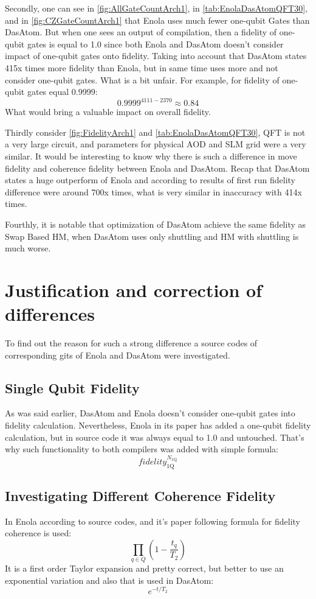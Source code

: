 Secondly, one can see in \ref{fig:AllGateCountArch1}, in \ref{tab:EnolaDasAtomQFT30}, 
and in \ref{fig:CZGateCountArch1} that Enola uses much fewer one-qubit Gates than DasAtom. 
But when one sees an output of compilation, 
then a fidelity of one-qubit gates is equal to 1.0 
since both Enola and DasAtom doesn't consider impact of one-qubit gates onto fidelity.
Taking into account that DasAtom states 415x times more fidelity than Enola, 
but in same time uses more and not consider one-qubit gates. What is a bit unfair.
For example, for fidelity of one-qubit gates equal 0.9999: \[0.9999^{4111 - 2370} \approx 0.84\]
What would bring a valuable impact on overall fidelity.

Thirdly consider \ref{fig:FidelityArch1} and \ref{tab:EnolaDasAtomQFT30}, \ac{QFT} is not a very large circuit, and parameters for physical \ac{AOD} and \ac{SLM} grid were a very similar.
It would be interesting to know why there is such a difference in move fidelity and coherence fidelity between Enola and DasAtom.
Recap that DasAtom states a huge outperform of Enola and according to results of first run fidelity difference were around 700x times, what is very similar in inaccuracy with 414x times.

Fourthly, it is notable that optimization of DasAtom achieve the same fidelity as Swap Based \ac{HM}, when DasAtom uses only shuttling and \ac{HM} with shuttling is much worse.

\section{Justification and correction of differences}
To find out the reason for such a strong difference a source codes of corresponding gits 
of Enola \parencite{Tan_2025_Enola} and DasAtom \parencite{huang2025dasatomdivideandshuttleatomapproach} were investigated.

\subsection{Single Qubit Fidelity}
As was said earlier, DasAtom and Enola doesn't consider one-qubit gates into fidelity calculation.
Nevertheless, Enola in its paper  has added a one-qubit fidelity calculation, but in source code it was always equal to 1.0 and untouched.
That's why such functionality to both compilers was added with simple formula: \[fidelity_{\mathrm{1Q}}^{N_{\mathrm{1Q}}}\]

\subsection{Investigating Different Coherence Fidelity}
In Enola according to source codes, and it's paper following formula for fidelity coherence is used:
\[\prod_{q \in Q} \left(1 - \frac{t_q}{T_2} \right)\]
It is a first order Taylor expansion and pretty correct, but better to use an exponential variation and also that is used in DasAtom:
\[e^{-t / T_2}\]

